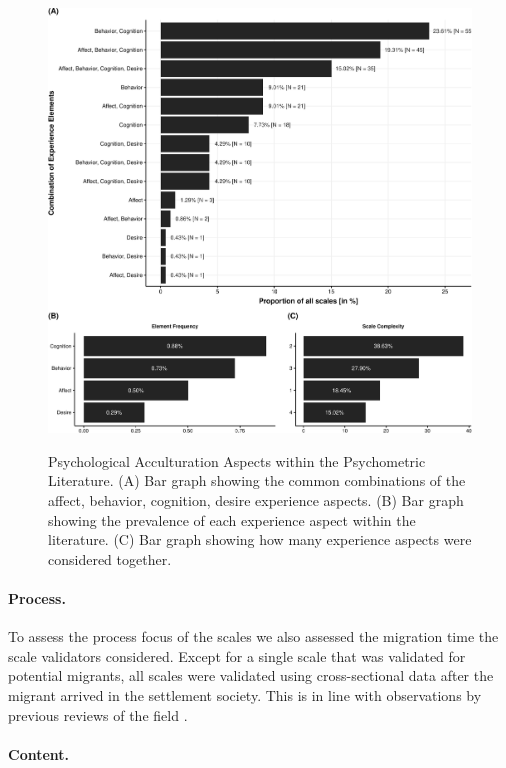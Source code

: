 \documentclass[man, 12pt, a4paper, mask]{apa7}
\begin{document}
\begin{figure}[h]
\centering
\caption{Psychological Acculturation Aspects within the Psychometric Literature. (A) Bar graph showing the common combinations of the affect, behavior, cognition, desire experience aspects. (B) Bar graph showing the prevalence of each experience aspect within the literature. (C) Bar graph showing how many experience aspects were considered together.}
\includegraphics[width=\textwidth]{Figures/ABCDFreq-1}
\label{fig:ElementsScales}
\end{figure}

\paragraph{Process.}

To assess the process focus of the scales we also assessed the migration
time the scale validators considered. Except for a single scale that was
validated for potential migrants, all scales were validated using
cross-sectional data after the migrant arrived in the settlement
society. This is in line with observations by previous reviews of the
field \citep[e.g.,][]{Brown2011}.

\paragraph{Content.}
\end{document}
